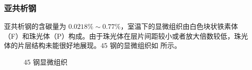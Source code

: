 \documentclass[a4paper,utf8]{article}
\begin{document}
    \subsubsection{亚共析钢}
    亚共析钢的含碳量为 $0.0218\%\sim 0.77\%$，室温下的显微组织由白色块状铁素体（F）和珠光体（P）构成。由于珠光体在层片间距较小或者放大倍数较低，珠光体的片层结构未能很好地展现。45 钢的显微组织如 所示。
    \begin{figure}[!ht]
        \hspace{20pt}
        \hspace{20pt}
        \caption{45 钢显微组织\label{fig:n2}}
    \end{figure}
\end{document}
